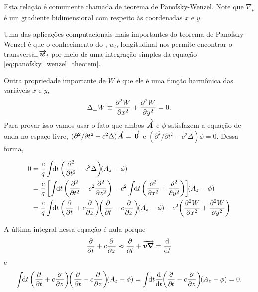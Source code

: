 Esta relação é comumente chamada de teorema de Panofsky-Wenzel. Note que $\nabla_\rho$ é um gradiente bidimensional com respeito às coordenadas $x$ e $y$.

Uma das aplicações computacionais mais importantes do teorema de Panofsky-Wenzel é que o conhecimento do , $w_l$, longitudinal nos permite encontrar o  transversal,$\vect{w}_t$ por meio de uma integração simples da equação \ref{eq:panofsky_wenzel_theorem}.

Outra propriedade importante de $W$ é que ele é uma função harmônica das variáveis $x$ e $y$,
\begin{equation}\label{eq:wake_potential_harmonic}
 \Delta_\perp W \equiv \derpar[2]{W}{x} + \derpar[2]{W}{y} = 0.
\end{equation}
Para provar isso vamos usar o fato que ambos $\vect{A}$ e $\phi$ satisfazem a equação de onda no espaço livre, $(\partial^2/\partial t^2 - c^2 \Delta)\vect{A} = \vect{0}$ e $(\partial^2/\partial t^2 - c^2 \Delta)\phi = 0$. Dessa forma,

\begin{equation}\begin{aligned}
0
&=\frac{c}{q}\udefint{t}{\left(\derpar[2]{}{t}-c^2\Delta\right)\!\!(A_z-\phi)}\\
&=\frac{c}{q}\left[\udefint{t}{\left(\derpar[2]{}{t} - c^2\derpar[2]{}{z}\right)} -
	            c^2\udefint{t}{\left(\derpar[2]{}{x} + \derpar[2]{}{y}\right)}\right]\!\!(A_z-\phi)\\
&=\frac{c}{q}\udefint{t}{\left(\derpar{}{t}+c\derpar{}{z}\right)
				     \!\!\left(\derpar{}{t}-c\derpar{}{z}\right)\!\!(A_z -\phi)}
   -c^2\!\left(\derpar[2]{W}{x} + \derpar[2]{W}{y}\right)
\end{aligned}\end{equation}

A última integral nessa equação é nula porque
\begin{equation}
    \derpar{}{t} + c\derpar{}{z} \approx \derpar{}{t} + \vect{v\nabla} = \dertot{}{t}
\end{equation}
e
\begin{equation}
  \udefint{t}{\left(\derpar{}{t} + c\derpar{}{z}\right)\!\!
             \left(\derpar{}{t} - c\derpar{}{z}\right)\!\!(A_z - \phi)}
  = \udefint{t}{\dertot{}{t}\!\!\left(\derpar{}{t}-c\derpar{}{z}\right)\!\!(A_z - \phi)}
  =  0.
\end{equation}

